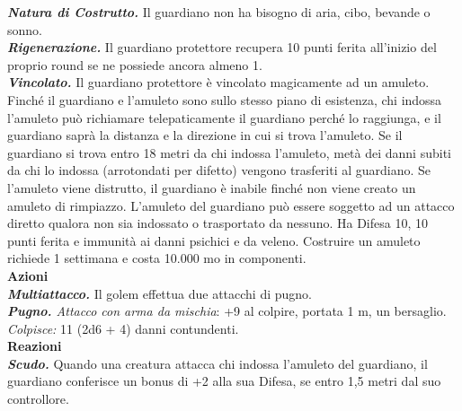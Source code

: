 \begin{multicols}{2}
\emph{\textbf{Natura di Costrutto.}} Il guardiano non ha bisogno di aria, cibo, bevande o sonno.\\
\emph{\textbf{Rigenerazione.}} Il guardiano protettore recupera 10 punti  ferita all'inizio del proprio round se ne possiede ancora almeno 1.\\
\emph{\textbf{Vincolato.}} Il guardiano protettore è vincolato magicamente ad un amuleto. Finché il guardiano e l'amuleto sono sullo stesso piano di esistenza, chi indossa l'amuleto può richiamare telepaticamente il guardiano perché lo raggiunga, e il guardiano saprà la distanza e la direzione in cui si trova l'amuleto. Se il guardiano si trova entro 18 metri da chi indossa l'amuleto, metà dei danni subiti da chi lo indossa (arrotondati per difetto) vengono trasferiti al guardiano. Se l'amuleto viene distrutto, il guardiano è inabile finché non viene creato un amuleto di rimpiazzo. L'amuleto del guardiano può essere soggetto ad un attacco diretto qualora non sia indossato o trasportato da nessuno. Ha Difesa 10, 10 punti ferita e immunità ai danni psichici e da veleno. Costruire un amuleto richiede 1 settimana e costa 10.000 mo in componenti.\\
\smallskip\textbf{Azioni}\\
\emph{\textbf{Multiattacco.}} Il golem effettua due attacchi di pugno.\\
\emph{\textbf{Pugno.} Attacco con arma da mischia}: +9 al colpire, portata 1 m, un bersaglio.\\
\emph{Colpisce:} 11 (2d6 + 4) danni contundenti.\\
\textbf{Reazioni}\\
\emph{\textbf{Scudo.}} Quando una creatura attacca chi indossa l'amuleto del guardiano, il guardiano conferisce un bonus di +2 alla sua Difesa, se entro 1,5 metri dal suo controllore.\\


\end{multicols}
